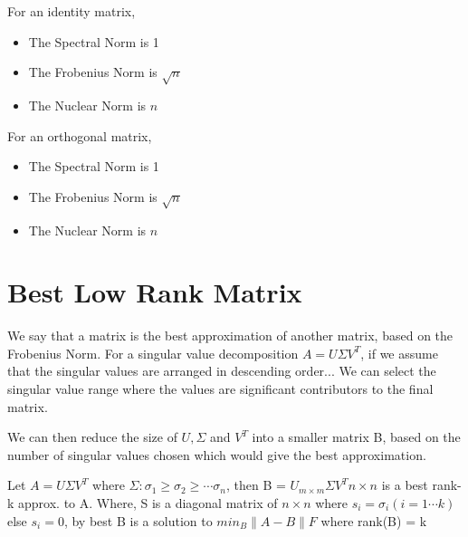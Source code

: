 \documentclass[twoside]{report}
\begin{document}
For an identity matrix, 
\begin{itemize}
	\item The Spectral Norm is 1
	\item The Frobenius Norm is $\sqrt{n}$
	\item The Nuclear Norm is ${n}$
\end{itemize}
For an orthogonal matrix, 
\begin{itemize}
	\item The Spectral Norm is 1
	\item The Frobenius Norm is $\sqrt{n}$
	\item The Nuclear Norm is ${n}$
\end{itemize}
\section{Best Low Rank Matrix}
We say that a matrix is the best approximation of another matrix, based on the Frobenius Norm.
For a singular value decomposition $A = U\Sigma V^T$, if we assume that the singular values are arranged in descending order... We can select the singular value range where the values are significant contributors to the final matrix.

We can then reduce the size of $U, \Sigma$ and $V^T$ into a smaller matrix B, based on the number of singular values chosen which would give the best approximation.
\begin{theorem}
	Let $A = U\Sigma V^T$ where $\Sigma: \sigma_1 \geq \sigma_2 \geq \cdots \sigma_n$, then B = $U_{m\times m} \Sigma V^T{n \times n}$ is a best rank-k approx. to A.
	Where, S is a diagonal matrix of $n \times n$ where $s_i = \sigma_i (i = 1\cdots k)$ else $s_i = 0$, by best B is a solution to $min_B \|A - B\|F$ where rank(B) = k
\end{theorem}
\end{document}
